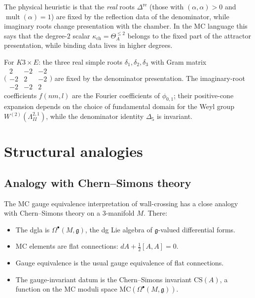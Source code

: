\documentclass[11pt]{article}
\theoremstyle{definition}
\theoremstyle{remark}
\newcommand{\frakg}{\mathfrak{g}}
\newcommand{\MC}{\mathrm{MC}}
\DeclareMathOperator{\mult}{mult}
\begin{document}
The physical heuristic is that the \emph{real} roots
$\Delta^{\mathrm{re}}$ (those with $(\alpha, \alpha) > 0$ and
$\mult(\alpha) = 1$) are fixed by the reflection data of the denominator,
while imaginary roots change presentation with the chamber. In the MC
language this says that the degree-$2$ scalar
$\kappa_{\mathrm{ch}} = \Theta^{\leq 2}_A$ belongs to the fixed part of
the attractor presentation, while binding data lives in higher degrees.

For $K3 \times E$: the three real simple roots
$\delta_1, \delta_2, \delta_3$ with Gram matrix
$\bigl(\begin{smallmatrix} 2 & -2 & -2 \\ -2 & 2 & -2 \\ -2 & -2 & 2
\end{smallmatrix}\bigr)$
are fixed by the denominator presentation. The imaginary-root coefficients
$f(nm, l)$ are the Fourier coefficients of $\phi_{0,1}$; their
positive-cone expansion depends on the choice of fundamental domain for
the Weyl group $W^{(2)}(\Lambda^{2,1}_{II})$, while the denominator
identity $\Delta_5$ is invariant.

\section{Structural analogies}
\label{sec:wc-outlook}

\subsection{Analogy with Chern--Simons theory}
\label{ssec:cs-analogy}

The MC gauge equivalence interpretation of wall-crossing has a close
analogy with Chern--Simons theory on a 3-manifold $M$. There:
\begin{itemize}
\item The dgla is $\Omega^\bullet(M, \frakg)$, the dg Lie algebra of
 $\frakg$-valued differential forms.
\item MC elements are flat connections:
 $dA + \frac{1}{2}[A, A] = 0$.
\item Gauge equivalence is the usual gauge equivalence of flat connections.
\item The gauge-invariant datum is the Chern--Simons invariant
 $\mathrm{CS}(A)$, a function on the MC moduli space
 $\overline{\MC}(\Omega^\bullet(M, \frakg))$.
\end{itemize}
\end{document}
